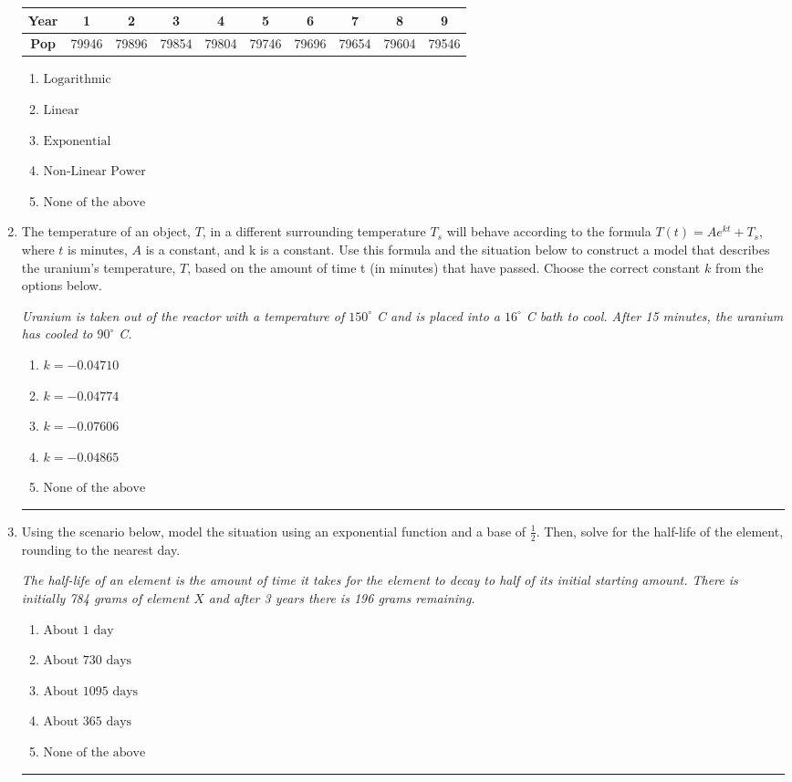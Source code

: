 \documentclass[14pt]{extbook}
\newcommand{\litem}[1]{\item#1\hspace*{-1cm}\rule{\textwidth}{0.4pt}}
\begin{document}
\begin{enumerate}
{\begin{tabular}{c|c|c|c|c|c|c|c|c|c}
\textbf{Year} &1 &2 &3 &4 &5 &6 &7 &8 &9\tabularnewline \hline
\textbf{Pop} &79946 &79896 &79854 &79804 &79746 &79696 &79654 &79604 &79546\end{tabular}\begin{enumerate}[label=\Alph*.]
\item \( \text{Logarithmic} \)
\item \( \text{Linear} \)
\item \( \text{Exponential} \)
\item \( \text{Non-Linear Power} \)
\item \( \text{None of the above} \)

\end{enumerate} }
\litem{
The temperature of an object, $T$, in a different surrounding temperature $T_s$ will behave according to the formula $T(t) = Ae^{kt} + T_s$, where $t$ is minutes, $A$ is a constant, and k is a constant. Use this formula and the situation below to construct a model that describes the uranium's temperature, $T$, based on the amount of time t (in minutes) that have passed. Choose the correct constant $k$ from the options below.
\begin{center}
    \textit{ Uranium is taken out of the reactor with a temperature of $150^{\circ}$ C and is placed into a $16^{\circ}$ C bath to cool. After 15 minutes, the uranium has cooled to $90^{\circ}$ C. }
\end{center}
\begin{enumerate}[label=\Alph*.]
\item \( k = -0.04710 \)
\item \( k = -0.04774 \)
\item \( k = -0.07606 \)
\item \( k = -0.04865 \)
\item \( \text{None of the above} \)

\end{enumerate} }
\litem{
Using the scenario below, model the situation using an exponential function and a base of $\frac{1}{2}$. Then, solve for the half-life of the element, rounding to the nearest day.
\begin{center}
    \textit{ The half-life of an element is the amount of time it takes for the element to decay to half of its initial starting amount. There is initially 784 grams of element $X$ and after 3 years there is 196 grams remaining. }
\end{center}
\begin{enumerate}[label=\Alph*.]
\item \( \text{About } 1 \text{ day} \)
\item \( \text{About } 730 \text{ days} \)
\item \( \text{About } 1095 \text{ days} \)
\item \( \text{About } 365 \text{ days} \)
\item \( \text{None of the above} \)


\end{enumerate}}
\end{enumerate}
\end{document}

